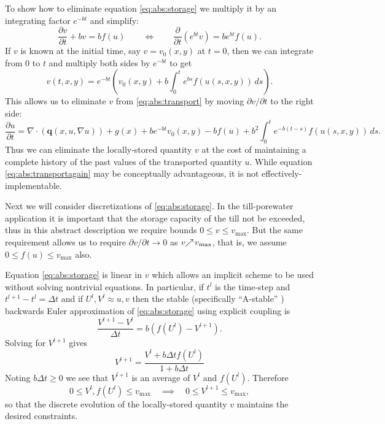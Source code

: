 \documentclass[11pt,final]{amsart}
\newcommand{\Div}{\nabla\cdot}
\newcommand{\grad}{\nabla}
\begin{document}
To show how to eliminate equation \eqref{eq:abs:storage} we multiply it by an integrating factor $e^{-bt}$ and simplify:
    $$\frac{\partial v}{\partial t} + b v = b f(u) \qquad \iff \qquad \frac{\partial}{\partial t} \left(e^{bt} v\right) = b e^{bt} f(u).$$
If $v$ is known at the initial time, say $v=v_0(x,y)$ at $t=0$, then we can integrate from $0$ to $t$ and multiply both sides by $e^{-bt}$ to get
    $$v(t,x,y) = e^{-bt} \left(v_0(x,y) + b \int_0^t e^{bs} f(u(s,x,y))\,ds\right).$$
This allows us to eliminate $v$ from \eqref{eq:abs:transport} by moving $\partial v/\partial t$ to the right side:
\begin{equation}
\frac{\partial u}{\partial t} = \Div \left(\mathbf{q}(x,u,\grad u)\right) + g(x) + b e^{-bt} v_0(x,y) - b f(u) + b^2 \int_0^t e^{-b(t-s)} f(u(s,x,y))\,ds. \label{eq:abs:transportagain} 
\end{equation}
Thus we can eliminate the locally-stored quantity $v$ at the cost of maintaining a complete history of the past values of the transported quantity $u$.  While equation \eqref{eq:abs:transportagain} may be conceptually advantageous, it is not effectively-implementable.

Next we will consider discretizations of \eqref{eq:abs:storage}.  In the till-porewater application it is important that the storage capacity of the till not be exceeded, thus in this abstract description we require bounds $0 \le v \le v_{\text{max}}$.  But the same requirement allows us to require $\partial v/\partial t \to 0$ as $v \!\!\nearrow\! v_{\text{max}}$, that is, we assume $0 \le f(u) \le v_{\text{max}}$ also.

Equation \eqref{eq:abs:storage} is linear in $v$ which allows an implicit scheme to be used without solving nontrivial equations.  In particular, if $t^l$ is the time-step and $t^{l+1}-t^l = \Delta t$ and if $U^l,V^l \approx u,v$ then the stable (specifically ``A-stable'' \citep{AscherPetzold}) backwards Euler approximation of \eqref{eq:abs:storage} using explicit coupling is
    $$\frac{V^{l+1} - V^l}{\Delta t} = b \left(f(U^l) - V^{l+1}\right).$$
Solving for $V^{l+1}$ gives
\begin{equation}
V^{l+1} = \frac{V^l + b \Delta t f(U^l)}{1 + b \Delta t}
\end{equation}
Noting $b \Delta t \ge 0$ we see that $V^{l+1}$ is an average of $V^l$ and $f(U^l)$.  Therefore
    $$0 \le V^l, f(U^l) \le v_{\text{max}} \quad \implies \quad 0 \le V^{l+1} \le v_{\text{max}},$$
so that the discrete evolution of the locally-stored quantity $v$ maintains the desired constraints.
\end{document}
